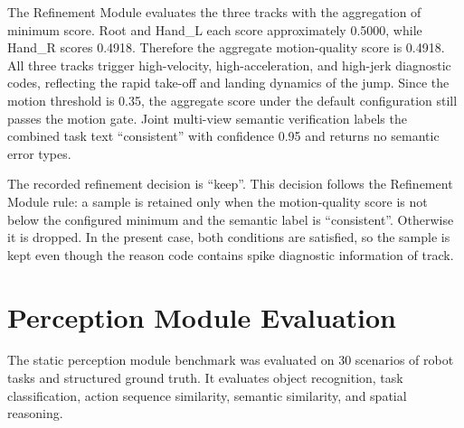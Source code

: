 \documentclass[11pt,oneside]{report}
\begin{document}
The Refinement Module evaluates the three tracks with the aggregation of minimum score. Root and Hand\_L each score approximately 0.5000, while Hand\_R scores 0.4918. Therefore the aggregate motion-quality score is 0.4918. All three tracks trigger high-velocity, high-acceleration, and high-jerk diagnostic codes, reflecting the rapid take-off and landing dynamics of the jump. Since the motion threshold is 0.35, the aggregate score under the default configuration still passes the motion gate. Joint multi-view semantic verification labels the combined task text “consistent” with confidence 0.95 and returns no semantic error types.

The recorded refinement decision is “keep”. This decision follows the Refinement Module rule: a sample is retained only when the motion-quality score is not below the configured minimum and the semantic label is “consistent”. Otherwise it is dropped. In the present case, both conditions are satisfied, so the sample is kept even though the reason code contains spike diagnostic information of track.

\section{Perception Module Evaluation}

The static perception module benchmark was evaluated on 30 scenarios of robot tasks and structured ground truth. It evaluates object recognition, task classification, action sequence similarity, semantic similarity, and spatial reasoning.
\end{document}
